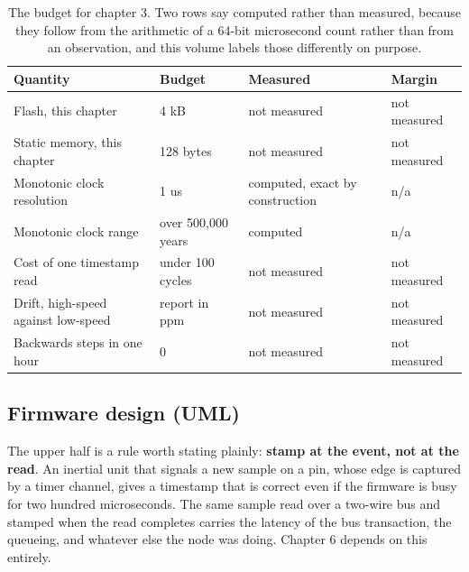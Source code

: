 \begin{table}[H]\centering\small
\begin{tabular}{p{44mm}p{28mm}p{28mm}p{30mm}}
\toprule
Quantity & Budget & Measured & Margin \\
\midrule
Flash, this chapter & 4 kB & not measured & not measured \\
Static memory, this chapter & 128 bytes & not measured & not measured \\
Monotonic clock resolution & 1 us & computed, exact by construction & n/a \\
Monotonic clock range & over 500,000 years & computed & n/a \\
Cost of one timestamp read & under 100 cycles & not measured & not measured \\
Drift, high-speed against low-speed & report in ppm & not measured & not measured \\
Backwards steps in one hour & 0 & not measured & not measured \\
\bottomrule
\end{tabular}
\caption{The budget for chapter 3. Two rows say computed rather than measured, because they follow from the arithmetic of a 64-bit microsecond count rather than from an observation, and this volume labels those differently on purpose.}
\end{table}

\subsection*{Firmware design (UML)}


The upper half is a rule worth stating plainly: \textbf{stamp at the event, not
at the read}. An inertial unit that signals a new sample on a pin, whose edge is
captured by a timer channel, gives a timestamp that is correct even if the
firmware is busy for two hundred microseconds. The same sample read over a
two-wire bus and stamped when the read completes carries the latency of the bus
transaction, the queueing, and whatever else the node was doing. Chapter 6
depends on this entirely.

